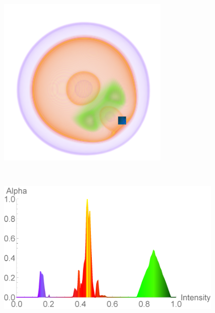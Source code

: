 \documentclass[twoside,twocolumn,10pt]{article}
\begin{document}
\begin{figure}
\begin{minipage}{.13\textwidth}
		\label{fig:tf_nucleon_2_blue}
	\end{minipage}~
	\begin{minipage}{.1\textwidth}
		\centering
		\includegraphics[width=1\linewidth]{nucleon_yellow_crop}
		\label{fig:nucleon_2_yellow}
	\end{minipage}~
	\begin{minipage}{.13\textwidth}
		\centering
		\includegraphics[width=1\linewidth]{tf_nucleon_2_yellow}

\end{minipage}
\end{figure}
\end{document}
